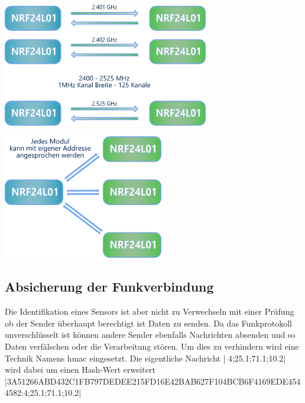 \documentclass[
  12pt, %
  a4paper, %
  twoside, %
  openany, %
  numbers=noenddot, %
  BCOR=5mm, %
  parskip=half*, %
  thesis, %
]{bfhbook}
\begin{document}
\begin{center}
    \begin{minipage}[b]{0.45\textwidth}
        \centering
        \includegraphics[width=9cm]{Bilder/NRF24Kommunikation.png}
        \captionsetup{justification=centering}
    \end{minipage}\hfill
    \begin{minipage}[b]{0.45\textwidth}
        \centering
        \includegraphics[width=7cm]{Bilder/NRF24Kommunikation-2.png} %
        \captionsetup{justification=centering}
    \end{minipage}
\end{center}
\subsection{Absicherung der Funkverbindung}
Die Identifikation eines Sensors ist aber nicht zu Verwechseln mit einer Prüfung ob der Sender überhaupt berechtigt ist Daten zu senden. Da das Funkprotokoll unverschlüsselt ist können andere Sender ebenfalls Nachrichten absenden und so Daten verfälschen oder die Verarbeitung stören. Um dies zu verhindern wird eine Technik Namens \Gls{hmac} eingesetzt.
Die eigentliche Nachricht | 4;25.1;71.1;10.2| wird dabei um einen Hash-Wert erweitert
|3A51266ABD432C1FB797DEDEE215FD16E42BAB627F104BCB6F4169EDE4544582:4;25.1;71.1;10.2|
\end{document}
